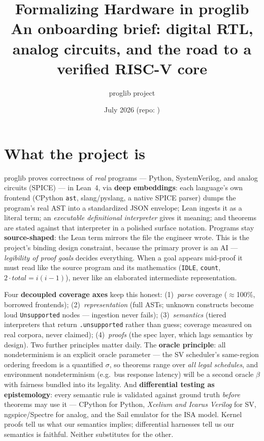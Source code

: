 \documentclass[10pt]{article}
\title{\vspace{-1.2em}Formalizing Hardware in \textsf{proglib}\\[2pt]
\large An onboarding brief: digital RTL, analog circuits, and the road to a verified RISC-V core}
\author{proglib project}
\date{July 2026 \quad(\small repo: \code{github.com/thomasnormal/proglib})}
\newcommand{\code}[1]{\texttt{#1}}
\begin{document}
\maketitle
\vspace{-2.2em}

\section{What the project is}
\textsf{proglib} proves correctness of \emph{real} programs --- Python, SystemVerilog,
and analog circuits (SPICE) --- in Lean~4, via \textbf{deep embeddings}: each language's own
frontend (CPython \code{ast}, slang/pyslang, a native SPICE parser) dumps the program's real
AST into a standardized JSON envelope; Lean ingests it as a literal term; an
\emph{executable definitional interpreter} gives it meaning; and theorems are stated against
that interpreter in a polished surface notation. Programs stay \textbf{source-shaped}: the
Lean term mirrors the file the engineer wrote. This is the project's binding design
constraint, because the primary prover is an AI --- \emph{legibility of proof goals} decides
everything. When a goal appears mid-proof it must read like the source program and its
mathematics (\code{IDLE}, \code{count}, $2\cdot\textit{total}=i(i-1)$), never like an
elaborated intermediate representation.

Four \textbf{decoupled coverage axes} keep this honest: (1)~\emph{parse} coverage
($\approx$100\%, borrowed frontends); (2)~\emph{representation} (full ASTs; unknown
constructs become loud \code{Unsupported} nodes --- ingestion never fails);
(3)~\emph{semantics} (tiered interpreters that return \code{.unsupported} rather than guess;
coverage measured on real corpora, never claimed); (4)~\emph{proofs} (the spec layer, which
lags semantics by design). Two further principles matter daily. The \textbf{oracle
principle}: all nondeterminism is an explicit oracle parameter --- the SV scheduler's
same-region ordering freedom is a quantified $\sigma$, so theorems range over \emph{all
legal schedules}, and environment nondeterminism (e.g.\ bus response latency) will be a
second oracle $\beta$ with fairness bundled into its legality. And \textbf{differential
testing as epistemology}: every semantic rule is validated against ground truth
\emph{before} theorems may use it --- CPython for Python, \emph{Xcelium and Icarus Verilog}
for SV, ngspice/Spectre for analog, and the Sail emulator for the ISA model. Kernel proofs
tell us what our semantics implies; differential harnesses tell us our semantics is faithful.
Neither substitutes for the other.
\end{document}
